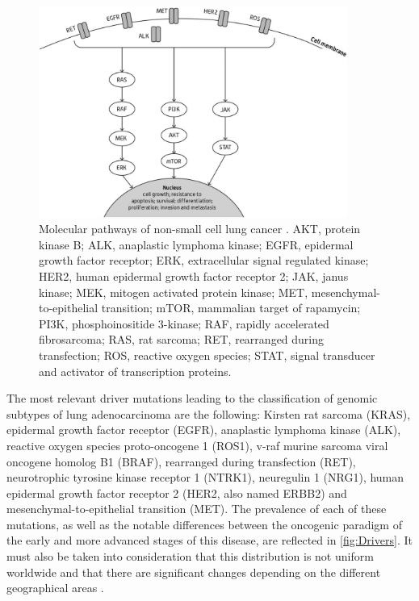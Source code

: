 \begin{figure}[t]
    \centering
    \includegraphics[width=0.9\textwidth]{Images/chapter_1/molecular_pathway.png}
    \caption{Molecular pathways of non-small cell lung cancer \cite{NSCLC_drivers}. AKT, protein kinase B; ALK, anaplastic lymphoma kinase; EGFR, epidermal growth factor receptor; ERK, extracellular signal regulated kinase; HER2, human epidermal growth factor receptor 2; JAK, janus kinase; MEK, mitogen activated protein kinase; MET, mesenchymal-to-epithelial transition; mTOR, mammalian target of rapamycin; PI3K, phosphoinositide 3-kinase; RAF, rapidly accelerated fibrosarcoma; RAS, rat sarcoma; RET, rearranged during transfection; ROS, reactive oxygen species; STAT, signal transducer and activator of transcription proteins.}
    \label{fig:Pathway}
\end{figure}

The most relevant driver mutations leading to the classification of genomic subtypes of lung adenocarcinoma are the following: Kirsten rat sarcoma (KRAS), epidermal growth factor receptor (EGFR), anaplastic lymphoma kinase (ALK), reactive oxygen species proto-oncogene 1 (ROS1), v-raf murine sarcoma viral oncogene homolog B1 (BRAF), rearranged during transfection (RET), neurotrophic tyrosine kinase receptor 1 (NTRK1), neuregulin 1 (NRG1), human epidermal growth factor receptor 2 (HER2, also named ERBB2) and mesenchymal-to-epithelial transition (MET). The prevalence of each of these mutations, as well as the notable differences between the oncogenic paradigm of the early and more advanced stages of this disease, are reflected in \autoref{fig:Drivers}. It must also be taken into consideration that this distribution is not uniform worldwide and that there are significant changes depending on the different geographical areas \cite{Mol_bio}.

